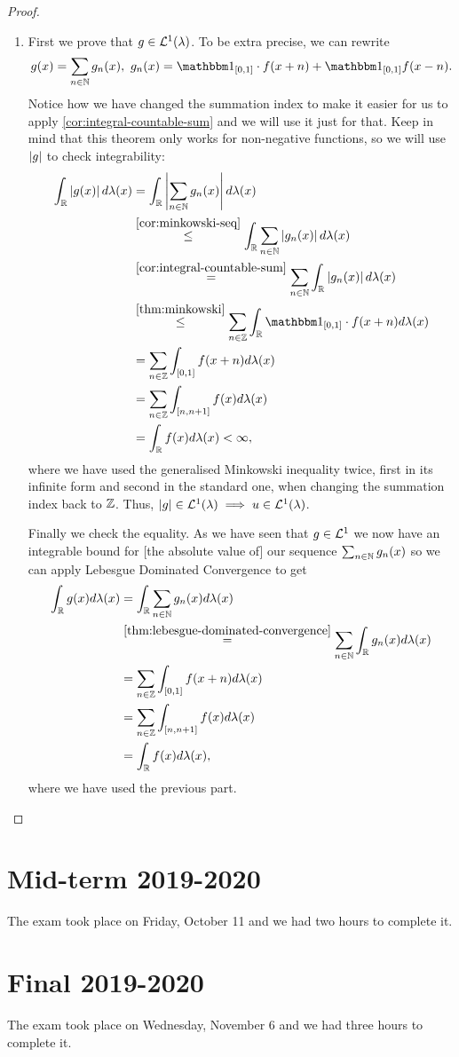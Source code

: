 \begin{proof}
\begin{enumerate}
		\item First we prove that $g \in \mathcal{L}^1(\lambda)$. To be extra precise, we can rewrite
		\begin{align*}
			g(x) = \sum_{n\in\N} g_n(x),\ g_n(x) = \ind_{[0,1]}\cdot f(x+ n) + \ind_{[0,1]} f(x - n).
		\end{align*}
		Notice how we have changed the summation index to make it easier for us to apply \autoref{cor:integral-countable-sum} and we will use it just for that. Keep in mind that this theorem only works for non-negative functions, so we will use $\left\vert{g}\right\vert$ to check integrability:
		\begin{align*}
			\int_\R \abs{g(x)} d\lambda(x)
			&= \int_\R \abs{\sum_{n\in\N} g_n(x)}d\lambda(x)\\
			&\overset{\ref{cor:minkowski-seq}}{\leq} \int_\R \sum_{n\in\N} \abs{g_n(x)}d\lambda(x)\\
			&\overset{\ref{cor:integral-countable-sum}}{=} \sum_{n\in\N} \int_\R \abs{g_n(x)} d\lambda(x)\\
			&\overset{\ref{thm:minkowski}}{\leq} \sum_{n\in\Z} \int_\R \ind_{[0,1]}\cdot f(x + n) d\lambda(x)\\
			&= \sum_{n\in\Z} \int_{[0,1]} f(x + n)d\lambda(x)\\
			&= \sum_{n\in\Z} \int_{[n, n+1]} f(x) d\lambda(x)\\
			&= \int_\R f(x) d\lambda(x) <\infty,
		\end{align*}
		where we have used the generalised Minkowski inequality twice, first in its infinite form and second in the standard one, when changing the summation index back to $\mathbb{Z}$. Thus, $\left\vert{g}\right\vert \in \mathcal{L}^1(\lambda) \implies u \in \mathcal{L}^1(\lambda)$.
		
		Finally we check the equality. As we have seen that $g \in \mathcal{L}^1$ we now have an integrable bound for [the absolute value of] our sequence $\sum_{n\in\mathbb{N}} g_n(x)$ so we can apply Lebesgue Dominated Convergence to get
		\begin{align*}
			\int_{\mathbb{R}} g(x) d\lambda(x)
			&= \int_{\mathbb{R}} \sum_{n\in\mathbb{N}} g_n(x) d\lambda(x)\\
			&\overset{\ref{thm:lebesgue-dominated-convergence}}{=} \sum_{n\in\mathbb{N}} \int_{\mathbb{R}} g_n(x)d\lambda(x)\\
			&= \sum_{n\in\mathbb{Z}} \int_{[0,1]} f(x + n)d\lambda(x)\\
			&= \sum_{n\in\mathbb{Z}} \int_{[n, n+1]} f(x) d\lambda(x)\\
			&= \int_{\mathbb{R}} f(x) d\lambda(x),
		\end{align*}
		where we have used the previous part.
	\end{enumerate}
\end{proof}

\section{Mid-term 2019-2020}

The exam took place on Friday, October 11 and we had two hours to complete it.

\section{Final 2019-2020}

The exam took place on Wednesday, November 6 and we had three hours to complete it.